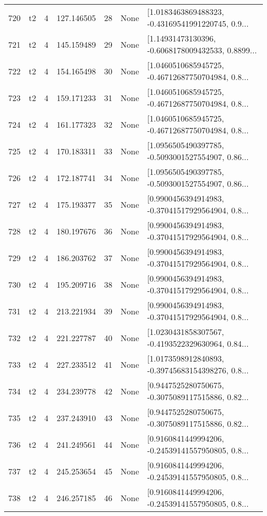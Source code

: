 \begin{tabular}{lllrlll}
720 &  t2 &   4 &   127.146505 &   28 &  None &  [1.0183463869488323, -0.43169541991220745, 0.9... \\
721 &  t2 &   4 &   145.159489 &   29 &  None &  [1.14931473130396, -0.6068178009432533, 0.8899... \\
722 &  t2 &   4 &   154.165498 &   30 &  None &  [1.0460510685945725, -0.46712687750704984, 0.8... \\
723 &  t2 &   4 &   159.171233 &   31 &  None &  [1.0460510685945725, -0.46712687750704984, 0.8... \\
724 &  t2 &   4 &   161.177323 &   32 &  None &  [1.0460510685945725, -0.46712687750704984, 0.8... \\
725 &  t2 &   4 &   170.183311 &   33 &  None &  [1.0956505490397785, -0.5093001527554907, 0.86... \\
726 &  t2 &   4 &   172.187741 &   34 &  None &  [1.0956505490397785, -0.5093001527554907, 0.86... \\
727 &  t2 &   4 &   175.193377 &   35 &  None &  [0.9900456394914983, -0.37041517929564904, 0.8... \\
728 &  t2 &   4 &   180.197676 &   36 &  None &  [0.9900456394914983, -0.37041517929564904, 0.8... \\
729 &  t2 &   4 &   186.203762 &   37 &  None &  [0.9900456394914983, -0.37041517929564904, 0.8... \\
730 &  t2 &   4 &   195.209716 &   38 &  None &  [0.9900456394914983, -0.37041517929564904, 0.8... \\
731 &  t2 &   4 &   213.221934 &   39 &  None &  [0.9900456394914983, -0.37041517929564904, 0.8... \\
732 &  t2 &   4 &   221.227787 &   40 &  None &  [1.0230431858307567, -0.4193522329630964, 0.84... \\
733 &  t2 &   4 &   227.233512 &   41 &  None &  [1.0173598912840893, -0.39745683154398276, 0.8... \\
734 &  t2 &   4 &   234.239778 &   42 &  None &  [0.9447525280750675, -0.3075089117515886, 0.82... \\
735 &  t2 &   4 &   237.243910 &   43 &  None &  [0.9447525280750675, -0.3075089117515886, 0.82... \\
736 &  t2 &   4 &   241.249561 &   44 &  None &  [0.9160841449994206, -0.24539141557950805, 0.8... \\
737 &  t2 &   4 &   245.253654 &   45 &  None &  [0.9160841449994206, -0.24539141557950805, 0.8... \\
738 &  t2 &   4 &   246.257185 &   46 &  None &  [0.9160841449994206, -0.24539141557950805, 0.8... \\

\end{tabular}
